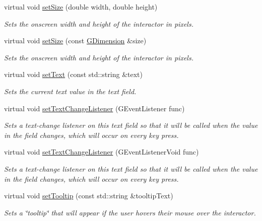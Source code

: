 \begin{DoxyCompactItemize}
virtual void \mbox{\hyperlink{classGInteractor_aca25d49481f9bf5fc8f7df4c086c4ce7}{set\+Size}} (double width, double height)
\begin{DoxyCompactList}\small\item\em Sets the onscreen width and height of the interactor in pixels. \end{DoxyCompactList}\item 
virtual void \mbox{\hyperlink{classGInteractor_ae2b628228f192c2702c4ce941b2af68f}{set\+Size}} (const \mbox{\hyperlink{structGDimension}{G\+Dimension}} \&size)
\begin{DoxyCompactList}\small\item\em Sets the onscreen width and height of the interactor in pixels. \end{DoxyCompactList}\item 
virtual void \mbox{\hyperlink{classGTextField_ac1ae51949d41ee9054634be5967d91b8}{set\+Text}} (const std\+::string \&text)
\begin{DoxyCompactList}\small\item\em Sets the current text value in the text field. \end{DoxyCompactList}\item 
virtual void \mbox{\hyperlink{classGTextField_ae41284f9c540110180ac0ad6beca5cb0}{set\+Text\+Change\+Listener}} (G\+Event\+Listener func)
\begin{DoxyCompactList}\small\item\em Sets a text-\/change listener on this text field so that it will be called when the value in the field changes, which will occur on every key press. \end{DoxyCompactList}\item 
virtual void \mbox{\hyperlink{classGTextField_ae8df75b0746951146d29220f386fcd33}{set\+Text\+Change\+Listener}} (G\+Event\+Listener\+Void func)
\begin{DoxyCompactList}\small\item\em Sets a text-\/change listener on this text field so that it will be called when the value in the field changes, which will occur on every key press. \end{DoxyCompactList}\item 
virtual void \mbox{\hyperlink{classGInteractor_a039e0e49beaecc275efce02d416acea8}{set\+Tooltip}} (const std\+::string \&tooltip\+Text)
\begin{DoxyCompactList}\small\item\em Sets a \char`\"{}tooltip\char`\"{} that will appear if the user hovers their mouse over the interactor. \end{DoxyCompactList}\item 

\end{DoxyCompactItemize}
